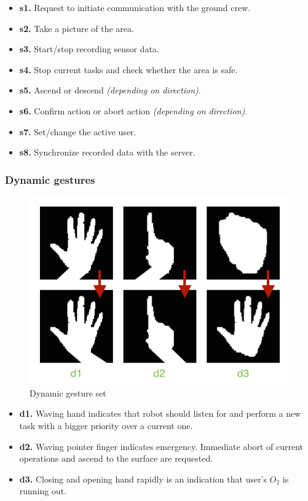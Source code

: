 \documentclass[a4paper,11pt,oneside]{article}
\begin{document}
  \begin{itemize}
  \item \textbf{s1.} Request to initiate communication with the ground crew.
  \item \textbf{s2.} Take a picture of the area.
  \item \textbf{s3.} Start/stop recording sensor data.
  \item \textbf{s4.} Stop current tasks and check whether the area is safe.
  \item \textbf{s5.} Ascend or descend \textit{(depending on direction)}.
  \item \textbf{s6.} Confirm action or abort action \textit{(depending on direction)}.
  \item \textbf{s7.} Set/change the active user.
  \item \textbf{s8.} Synchronize recorded data with the server.
  \end{itemize}
  
\subsubsection{Dynamic gestures}

\begin{figure}[H]
\centering
\includegraphics[scale=0.6]{dynamic-gestureset.png}
\caption{Dynamic gesture set}
\end{figure}

\begin{itemize}
  \item \textbf{d1.} Waving hand indicates that robot should listen for and perform a new task with a bigger priority over a current one.
  \item \textbf{d2.} Waving pointer finger indicates emergency. Immediate abort of current operations and ascend to the surface are requested.
  \item \textbf{d3.} Closing and opening hand rapidly is an indication that user's $O_2$ is running out.
  \end{itemize}
\end{document}
